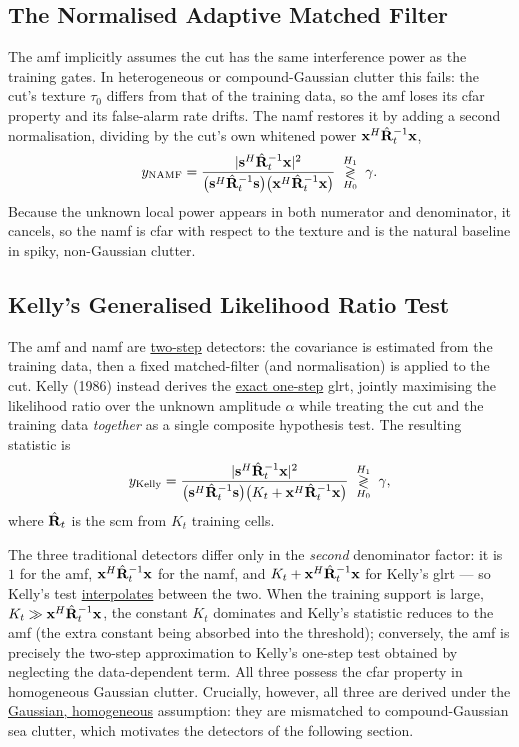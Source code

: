 \documentclass{article}
\begin{document}
\subsection{The Normalised Adaptive Matched Filter}
The \gls{amf} implicitly assumes the \gls{cut} has the same interference power as the training gates. In heterogeneous or compound-Gaussian clutter this fails: the \gls{cut}'s texture $\tau_0$ differs from that of the training data, so the \gls{amf} loses its \gls{cfar} property and its false-alarm rate drifts. The \gls{namf} restores it by adding a second normalisation, dividing by the \gls{cut}'s own whitened power $\vb x^H\hat{\mathbf{R}}_t^{-1}\vb x$,
$$y_{\text{NAMF}} = \frac{|\vb s^H\hat{\mathbf{R}}_t^{-1}\vb x|^2}
   {\big(\vb s^H\hat{\mathbf{R}}_t^{-1}\vb s\big)\big(\vb x^H\hat{\mathbf{R}}_t^{-1}\vb x\big)}
   \;\underset{H_0}{\overset{H_1}{\gtrless}}\;\gamma.$$
Because the unknown local power appears in both numerator and denominator, it cancels, so the \gls{namf} is \gls{cfar} with respect to the texture and is the natural baseline in spiky, non-Gaussian clutter.

\subsection{Kelly's Generalised Likelihood Ratio Test}
The \gls{amf} and \gls{namf} are \underline{two-step} detectors: the covariance is estimated from the training data, then a fixed matched-filter (and normalisation) is applied to the \gls{cut}. Kelly (1986) instead derives the \underline{exact one-step} \gls{glrt}, jointly maximising the likelihood ratio over the unknown amplitude $\alpha$ while treating the \gls{cut} and the training data \emph{together} as a single composite hypothesis test. The resulting statistic is
$$y_{\text{Kelly}} = \frac{|\vb s^H\hat{\mathbf{R}}_t^{-1}\vb x|^2}{\big(\vb s^H\hat{\mathbf{R}}_t^{-1}\vb s\big)\big(K_t + \vb x^H\hat{\mathbf{R}}_t^{-1}\vb x\big)}\;\underset{H_0}{\overset{H_1}{\gtrless}}\;\gamma,$$
where $\hat{\mathbf{R}}_t$ is the \gls{scm} from $K_t$ training cells.

The three traditional detectors differ only in the \emph{second} denominator factor: it is $1$ for the \gls{amf}, $\vb x^H\hat{\mathbf{R}}_t^{-1}\vb x$ for the \gls{namf}, and $K_t + \vb x^H\hat{\mathbf{R}}_t^{-1}\vb x$ for Kelly's \gls{glrt} --- so Kelly's test \underline{interpolates} between the two. When the training support is large, $K_t\gg\vb x^H\hat{\mathbf{R}}_t^{-1}\vb x$, the constant $K_t$ dominates and Kelly's statistic reduces to the \gls{amf} (the extra constant being absorbed into the threshold); conversely, the \gls{amf} is precisely the two-step approximation to Kelly's one-step test obtained by neglecting the data-dependent term. All three possess the \gls{cfar} property in homogeneous Gaussian clutter. Crucially, however, all three are derived under the \underline{Gaussian, homogeneous} assumption: they are mismatched to compound-Gaussian sea clutter, which motivates the detectors of the following section.
\end{document}
